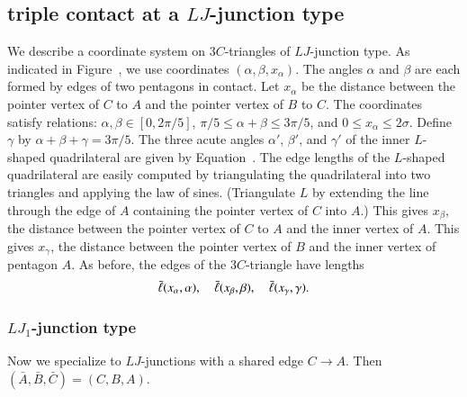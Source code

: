 \subsection{triple contact at a $LJ$-junction type}

We describe a coordinate system on $3C$-triangles of $LJ$-junction
type.  As indicated in Figure~, we use coordinates
$(\alpha,\beta,x_\alpha)$.  The angles $\alpha$ and $\beta$ are each
formed by edges of two pentagons in contact.  Let $x_\alpha$ be the
distance between the pointer vertex of $C$ to $A$ and the pointer
vertex of $B$ to $C$.  The coordinates satisfy relations:
$\alpha,\beta\in [0,2\pi/5]$, $\pi/5\le\alpha+\beta\le 3\pi/5$, and
$0\le x_\alpha\le 2\sigma$.  Define $\gamma$ by
$\alpha+\beta+\gamma=3\pi/5$.  The three acute angles $\alpha'$,
$\beta'$, and $\gamma'$ of the inner $L$-shaped quadrilateral are
given by Equation~.  The edge lengths of the $L$-shaped
quadrilateral are easily computed by triangulating the quadrilateral
into two triangles and applying the law of sines.  (Triangulate $L$ by
extending the line through the edge of $A$ containing the pointer
vertex of $C$ into $A$.)  This gives $x_\beta$, the distance between
the pointer vertex of $C$ to $A$ and the inner vertex of $A$.  This
gives $x_\gamma$, the distance between the pointer vertex of $B$ and
the inner vertex of pentagon $A$.  As before, the edges of the
$3C$-triangle have lengths
\[
\bar\ell(x_\alpha,\alpha),\quad \bar\ell(x_\beta,\beta),\quad \bar\ell(x_\gamma,\gamma).
\]


\subsubsection{$LJ_1$-junction type}

Now we specialize to $LJ$-junctions with a shared edge $C\to A$.
Then $(\bar A,\bar B,\bar C)=(C,B,A)$.

